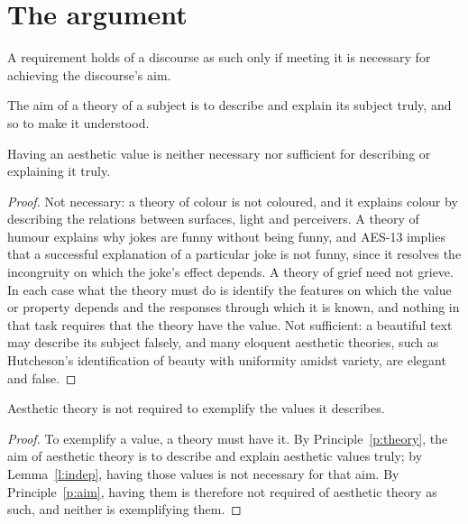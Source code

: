 \documentclass{situationist-preprint}
\begin{document}
\section{The argument}

\begin{principle}[Aim]\label{p:aim}
A requirement holds of a discourse as such only if meeting it is necessary for achieving the discourse's aim.
\end{principle}

\begin{principle}[Theory]\label{p:theory}
The aim of a theory of a subject is to describe and explain its subject truly, and so to make it understood.
\end{principle}

\begin{lemma}\label{l:indep}
Having an aesthetic value is neither necessary nor sufficient for describing or explaining it truly.
\end{lemma}

\begin{proof}
Not necessary: a theory of colour is not coloured, and it explains colour by describing the relations between surfaces, light and perceivers. A theory of humour explains why jokes are funny without being funny, and AES-13 implies that a successful explanation of a particular joke is not funny, since it resolves the incongruity on which the joke's effect depends. A theory of grief need not grieve. In each case what the theory must do is identify the features on which the value or property depends and the responses through which it is known, and nothing in that task requires that the theory have the value. Not sufficient: a beautiful text may describe its subject falsely, and many eloquent aesthetic theories, such as Hutcheson's identification of beauty with uniformity amidst variety, are elegant and false.
\end{proof}

\begin{theorem}\label{t:main}
Aesthetic theory is not required to exemplify the values it describes.
\end{theorem}

\begin{proof}
To exemplify a value, a theory must have it. By Principle~\ref{p:theory}, the aim of aesthetic theory is to describe and explain aesthetic values truly; by Lemma~\ref{l:indep}, having those values is not necessary for that aim. By Principle~\ref{p:aim}, having them is therefore not required of aesthetic theory as such, and neither is exemplifying them.
\end{proof}
\end{document}
